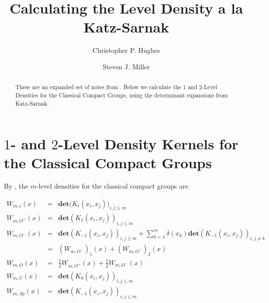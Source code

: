 \documentclass{compositio}
\newcommand*{\pkg}[1]{{\mdseries\textsf{#1}}}
\newcommand{\foh}{\frac{1}{2}}  %
\begin{document}
\title{Calculating the Level Density a la Katz-Sarnak}
%
\author{Christopher P. Hughes}
\address{American Institute of Mathematics, Palo Alto, CA,
$94306$}
\author{Steven J. Miller}
\address{Department of Mathematics, The Ohio State University, Columbus, Ohio}
 

\begin{abstract}
These are an expanded set of notes from \cite{Mil1}. Below we
calculate the 1 and 2-Level Densities for the Classical Compact
Groups, using the determinant expansions from Katz-Sarnak.
\end{abstract}

\maketitle





\section{$1$- and $2$-Level Density Kernels for the Classical Compact
Groups} \setcounter{equation}{0}

By \cite{KS1}, the $m$-level densities for the classical compact
groups are

\begin{eqnarray}\label{eqdensitykernels}
W_{m,\epsilon}(x) & = & \textbf{det} \Big(
K_\epsilon(x_i,x_j)\Big)_{i,j\leq m}  \nonumber\\ W_{m,O^+}(x) & =
& \textbf{det} (K_1(x_i,x_j))_{i,j\leq m} \nonumber\\ W_{m,O^-}(x)
& = & \textbf{det} (K_{-1}(x_i,x_j))_{i,j\leq m}  + \sum_{k=1}^m
\delta(x_k) \textbf{det}(K_{-1}(x_i,x_j))_{i,j\neq k} \nonumber\\
& = & (W_{m,O^-})_{1}(x) + (W_{m,O^-})_{2}(x) \nonumber\\
W_{m,O}(x) & = & \foh W_{m,O^+}(x) + \foh W_{m,O^-}(x) \nonumber\\
W_{m,U}(x) & = & \textbf{det} (K_0(x_i,x_j))_{i,j\leq m}
\nonumber\\ W_{m,Sp}(x) &=& \textbf{det}
(K_{-1}(x_i,x_j))_{i,j\leq m}
\end{eqnarray}
\end{document}
